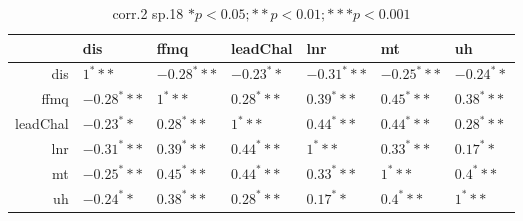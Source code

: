 \begin{table}[ht]
\centering
\begin{tabular}{rllllll}
  \hline
 & dis & ffmq & leadChal & lnr & mt & uh \\ 
  \hline
dis & $1^***$ & $-0.28^***$ & $-0.23^**$ & $-0.31^***$ & $-0.25^***$ & $-0.24^**$ \\ 
  ffmq & $-0.28^***$ & $1^***$ & $0.28^***$ & $0.39^***$ & $0.45^***$ & $0.38^***$ \\ 
  leadChal & $-0.23^**$ & $0.28^***$ & $1^***$ & $0.44^***$ & $0.44^***$ & $0.28^***$ \\ 
  lnr & $-0.31^***$ & $0.39^***$ & $0.44^***$ & $1^***$ & $0.33^***$ & $0.17^**$ \\ 
  mt & $-0.25^***$ & $0.45^***$ & $0.44^***$ & $0.33^***$ & $1^***$ & $0.4^***$ \\ 
  uh & $-0.24^**$ & $0.38^***$ & $0.28^***$ & $0.17^**$ & $0.4^***$ & $1^***$ \\ 
   \hline
\end{tabular}
\caption{corr.2 sp.18 $* p < 0.05; ** p < 0.01; *** p < 0.001$} 
\end{table}
